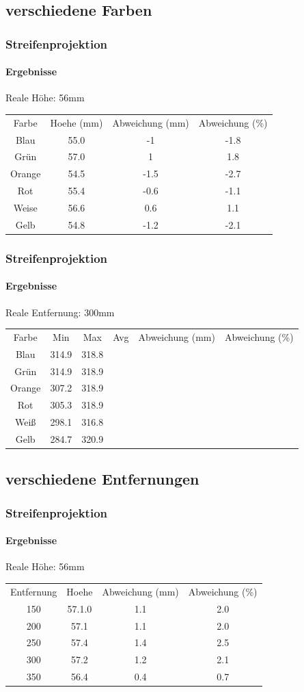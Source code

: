 \documentclass{beamer}
\begin{document}
\subsection{verschiedene Farben}
\begin{frame}
	\frametitle{Streifenprojektion}
	\framesubtitle{Ergebnisse}

	Reale Höhe: 56mm
	\begin{tabular}{c|c|c|c}
		Farbe & Hoehe (mm) & Abweichung (mm) & Abweichung (\%) \\
		Blau & 55.0 & -1 & -1.8\\
		Grün & 57.0 & 1 & 1.8\\
		Orange & 54.5 & -1.5 & -2.7\\
		Rot & 55.4 & -0.6 & -1.1\\
		Weise & 56.6 & 0.6 & 1.1\\
		Gelb & 54.8 & -1.2 & -2.1	
	\end{tabular}

\end{frame}

\begin{frame}
	\frametitle{Streifenprojektion}
	\framesubtitle{Ergebnisse}

	Reale Entfernung: 300mm 
	\begin{tabular}{c|c|c|c|c|c}
		Farbe & Min & Max & Avg & Abweichung (mm) & Abweichung (\%)\\
		Blau & 314.9 & 318.8\\
		Grün & 314.9 & 318.9\\
		Orange & 307.2 & 318.9\\
		Rot & 305.3 & 318.9\\
		Weiß & 298.1 & 316.8\\
		Gelb & 284.7 & 320.9
	\end{tabular}

\end{frame}

\subsection{verschiedene Entfernungen}
\begin{frame}
	\frametitle{Streifenprojektion}
	\framesubtitle{Ergebnisse}

	Reale Höhe: 56mm
	\begin{tabular}{c|c|c|c}
		Entfernung & Hoehe & Abweichung (mm) & Abweichung (\%) \\
		150 & 57.1.0 & 1.1 & 2.0\\
		200 & 57.1 & 1.1 & 2.0\\
		250 & 57.4 & 1.4 & 2.5\\
		300 & 57.2 & 1.2 & 2.1\\
		350 & 56.4 & 0.4 & 0.7
	\end{tabular}

\end{frame}
\end{document}
